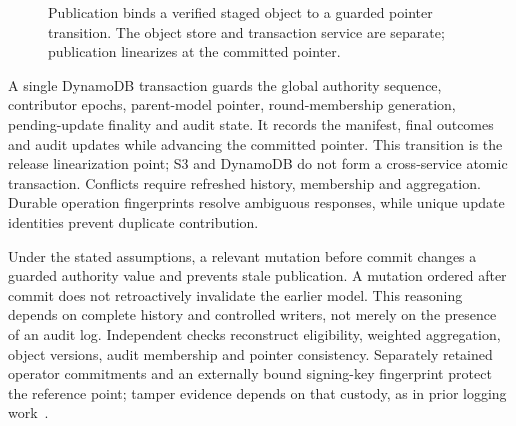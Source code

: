 \documentclass[conference,letterpaper]{IEEEtran}
\begin{document}
\begin{figure}[t]
\centering
{}
\caption{Publication binds a verified staged object to a guarded pointer transition. The object store and transaction service are separate; publication linearizes at the committed pointer.}
\label{fig:protocol}
\end{figure}

A single DynamoDB transaction guards the global authority sequence, contributor epochs, parent-model pointer, round-membership generation, pending-update finality and audit state. It records the manifest, final outcomes and audit updates while advancing the committed pointer. This transition is the release linearization point; S3 and DynamoDB do not form a cross-service atomic transaction. Conflicts require refreshed history, membership and aggregation. Durable operation fingerprints resolve ambiguous responses, while unique update identities prevent duplicate contribution.

Under the stated assumptions, a relevant mutation before commit changes a guarded authority value and prevents stale publication. A mutation ordered after commit does not retroactively invalidate the earlier model. This reasoning depends on complete history and controlled writers, not merely on the presence of an audit log. Independent checks reconstruct eligibility, weighted aggregation, object versions, audit membership and pointer consistency. Separately retained operator commitments and an externally bound signing-key fingerprint protect the reference point; tamper evidence depends on that custody, as in prior logging work~\cite{logging}.
\end{document}
